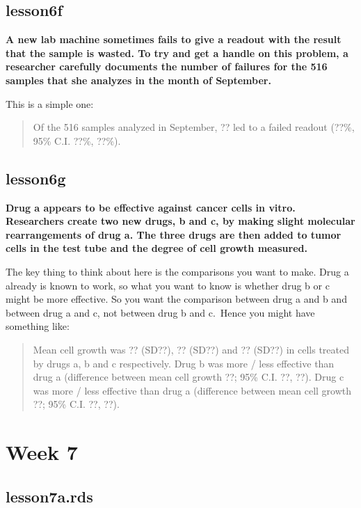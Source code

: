 \documentclass[]{book}
\begin{document}
\hypertarget{lesson6f}{%
\subsection{lesson6f}\label{lesson6f}}

\textbf{A new lab machine sometimes fails to give a readout with the
result that the sample is wasted. To try and get a handle on this
problem, a researcher carefully documents the number of failures for the
516 samples that she analyzes in the month of September.}

This is a simple one:

\begin{quote}
Of the 516 samples analyzed in September, ?? led to a failed readout
(??\%, 95\% C.I. ??\%, ??\%).
\end{quote}

\hypertarget{lesson6g}{%
\subsection{lesson6g}\label{lesson6g}}

\textbf{Drug a appears to be effective against cancer cells in vitro.
Researchers create two new drugs, b and c, by making slight molecular
rearrangements of drug a. The three drugs are then added to tumor cells
in the test tube and the degree of cell growth measured.}

The key thing to think about here is the comparisons you want to make.
Drug a already is known to work, so what you want to know is whether
drug b or c might be more effective. So you want the comparison between
drug a and b and between drug a and c, not between drug b and c.~Hence
you might have something like:

\begin{quote}
Mean cell growth was ?? (SD??), ?? (SD??) and ?? (SD??) in cells treated
by drugs a, b and c respectively. Drug b was more / less effective than
drug a (difference between mean cell growth ??; 95\% C.I. ??, ??). Drug
c was more / less effective than drug a (difference between mean cell
growth ??; 95\% C.I. ??, ??).
\end{quote}

\hypertarget{week-7-1}{%
\section{Week 7}\label{week-7-1}}

\hypertarget{lesson7a.rds}{%
\subsection{lesson7a.rds}\label{lesson7a.rds}}
\end{document}
